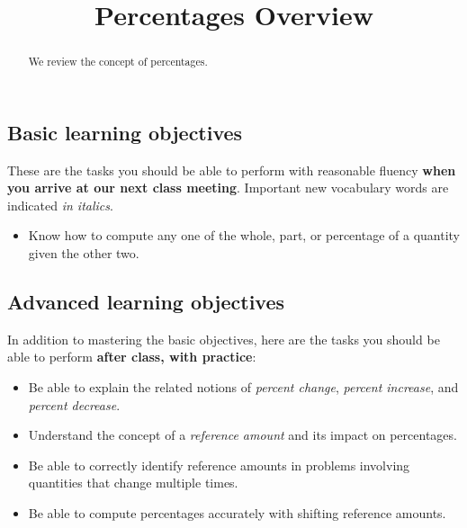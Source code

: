 \documentclass{ximera}
\title{Percentages Overview}
\begin{document}
\begin{abstract}
We review the concept of percentages.
\end{abstract}
\maketitle

\subsection*{Basic learning objectives}

These are the tasks you should be able to perform with reasonable fluency \textbf{when you arrive at our next class meeting}. Important new vocabulary words are indicated \emph{in italics}. 

\begin{itemize}
	\item Know how to compute any one of the whole, part, or percentage of a quantity given the other two.
\end{itemize}

\subsection*{Advanced learning objectives}

In addition to mastering the basic objectives, here are the tasks you should be able to perform \textbf{after class, with practice}: 

\begin{itemize}
	\item Be able to explain the related notions of \emph{percent change}, \emph{percent increase}, and \emph{percent decrease}.
	\item Understand the concept of a \emph{reference amount} and its impact on percentages.
	\item Be able to correctly identify reference amounts in problems involving quantities that change multiple times.
	\item Be able to compute percentages accurately with shifting reference amounts.
\end{itemize}
\end{document}
